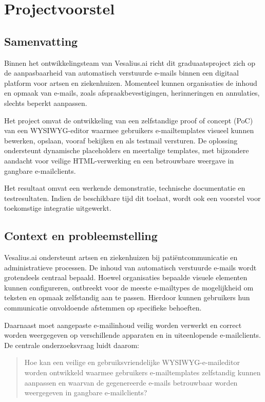 \chapter{Projectvoorstel}
\label{app:projectvoorstel}

\section{Samenvatting}
Binnen het ontwikkelingsteam van Vesalius.ai richt dit graduaatsproject
zich op de aanpasbaarheid van automatisch verstuurde e-mails binnen een
digitaal platform voor artsen en ziekenhuizen. Momenteel kunnen organisaties
de inhoud en opmaak van e-mails, zoals afspraakbevestigingen, herinneringen
en annulaties, slechts beperkt aanpassen.

Het project omvat de ontwikkeling van een zelfstandige proof of concept
(PoC) van een WYSIWYG-editor waarmee gebruikers e-mailtemplates visueel
kunnen bewerken, opslaan, vooraf bekijken en als testmail versturen.
De oplossing ondersteunt dynamische placeholders en meertalige templates,
met bijzondere aandacht voor veilige HTML-verwerking en een betrouwbare
weergave in gangbare e-mailclients.

Het resultaat omvat een werkende demonstratie, technische documentatie
en testresultaten. Indien de beschikbare tijd dit toelaat, wordt ook
een voorstel voor toekomstige integratie uitgewerkt.

\section{Context en probleemstelling}
Vesalius.ai ondersteunt artsen en ziekenhuizen bij patiëntcommunicatie
en administratieve processen. De inhoud van automatisch verstuurde
e-mails wordt grotendeels centraal bepaald. Hoewel organisaties bepaalde
visuele elementen kunnen configureren, ontbreekt voor de meeste
e-mailtypes de mogelijkheid om teksten en opmaak zelfstandig aan te
passen. Hierdoor kunnen gebruikers hun communicatie onvoldoende afstemmen
op specifieke behoeften.

Daarnaast moet aangepaste e-mailinhoud veilig worden verwerkt en correct
worden weergegeven op verschillende apparaten en in uiteenlopende
e-mailclients. De centrale onderzoeksvraag luidt daarom:

\begin{quote}
Hoe kan een veilige en gebruiksvriendelijke WYSIWYG-e-maileditor worden
ontwikkeld waarmee gebruikers e-mailtemplates zelfstandig kunnen aanpassen
en waarvan de gegenereerde e-mails betrouwbaar worden weergegeven in
gangbare e-mailclients?
\end{quote}

